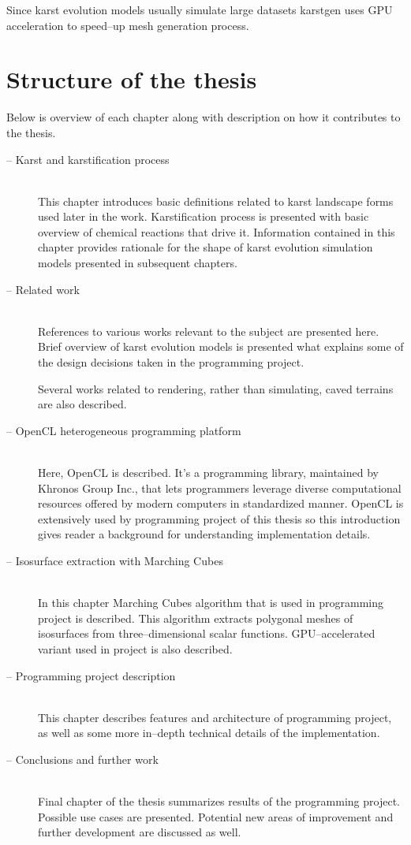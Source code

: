Since karst evolution models usually simulate large datasets karstgen uses
GPU acceleration to speed--up mesh generation process.

\pagebreak
\section{Structure of the thesis}

Below is overview of each chapter along with description on how it contributes to
the thesis.
\begin{description}
  \item[ -- Karst and karstification process] \hfill \\
    This chapter introduces basic definitions related to karst landscape forms
    used later in the work. Karstification process is presented with basic
    overview of chemical reactions that drive it. Information contained in this
    chapter provides rationale for the shape of karst evolution simulation
    models presented in subsequent chapters.
  \item[ -- Related work] \hfill \\
    References to various works relevant to the subject are presented here.
    Brief overview of karst evolution models is presented what explains some
    of the design decisions taken in the programming project.

    Several works related to rendering, rather than simulating, caved terrains
    are also described.
  \item[ -- OpenCL heterogeneous programming platform] \hfill \\
    Here, OpenCL is described. It's a programming library, maintained by Khronos
    Group Inc., that lets programmers leverage diverse computational resources
    offered by modern computers in standardized manner. OpenCL is extensively
    used by programming project of this thesis so this introduction gives
    reader a background for understanding implementation details.
  \item[ -- Isosurface extraction with Marching Cubes] \hfill \\
    In this chapter Marching Cubes algorithm that is used in programming project
    is described. This algorithm extracts polygonal meshes of isosurfaces from
    three--dimensional scalar functions. GPU--accelerated variant used in
    project is also described.
  \item[ -- Programming project description] \hfill \\
    This chapter describes features and architecture of programming project, as
    well as some more in--depth technical details of the implementation.
  \item[ -- Conclusions and further work] \hfill \\
    Final chapter of the thesis summarizes results of the programming project.
    Possible use cases are presented. Potential new areas of improvement and
    further development are discussed as well.
\end{description}

